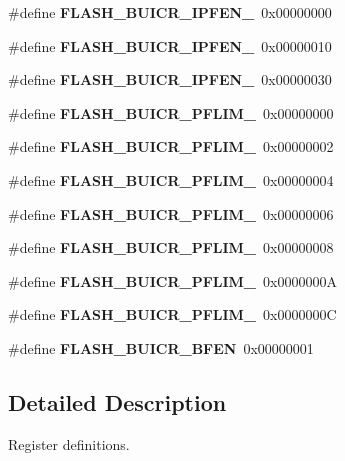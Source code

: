\begin{DoxyCompactItemize}
\item 
\mbox{\label{reg-defs_8h_aa7f5a7d411a1228d39bd9f248274e2bf}} 
\#define {\bfseries F\+L\+A\+S\+H\+\_\+\+B\+U\+I\+C\+R\+\_\+\+I\+P\+F\+E\+N\+\_}~0x00000000
\item 
\mbox{\label{reg-defs_8h_ab41bc9fd6944ae9451d095aac8290ccf}} 
\#define {\bfseries F\+L\+A\+S\+H\+\_\+\+B\+U\+I\+C\+R\+\_\+\+I\+P\+F\+E\+N\+\_}~0x00000010
\item 
\mbox{\label{reg-defs_8h_aeefc9d3ed5856912bfe6ab5da76278e8}} 
\#define {\bfseries F\+L\+A\+S\+H\+\_\+\+B\+U\+I\+C\+R\+\_\+\+I\+P\+F\+E\+N\+\_}~0x00000030
\item 
\mbox{\label{reg-defs_8h_ab03845501d962e827b3a86c6a37a3ec2}} 
\#define {\bfseries F\+L\+A\+S\+H\+\_\+\+B\+U\+I\+C\+R\+\_\+\+P\+F\+L\+I\+M\+\_}~0x00000000
\item 
\mbox{\label{reg-defs_8h_ac730dd960039d3eeffe9a1a26efdcfab}} 
\#define {\bfseries F\+L\+A\+S\+H\+\_\+\+B\+U\+I\+C\+R\+\_\+\+P\+F\+L\+I\+M\+\_}~0x00000002
\item 
\mbox{\label{reg-defs_8h_a8a24ce58132aa66f821b9fc68f351e91}} 
\#define {\bfseries F\+L\+A\+S\+H\+\_\+\+B\+U\+I\+C\+R\+\_\+\+P\+F\+L\+I\+M\+\_}~0x00000004
\item 
\mbox{\label{reg-defs_8h_af2fc91e06d03359f259cded35ed5b239}} 
\#define {\bfseries F\+L\+A\+S\+H\+\_\+\+B\+U\+I\+C\+R\+\_\+\+P\+F\+L\+I\+M\+\_}~0x00000006
\item 
\mbox{\label{reg-defs_8h_a9b68ba27e80dca1237f361ea7b66ae93}} 
\#define {\bfseries F\+L\+A\+S\+H\+\_\+\+B\+U\+I\+C\+R\+\_\+\+P\+F\+L\+I\+M\+\_}~0x00000008
\item 
\mbox{\label{reg-defs_8h_a42ce5eac94aabb79a14d8697417ac7c4}} 
\#define {\bfseries F\+L\+A\+S\+H\+\_\+\+B\+U\+I\+C\+R\+\_\+\+P\+F\+L\+I\+M\+\_}~0x0000000A
\item 
\mbox{\label{reg-defs_8h_adb78fb9a4ad177aace2b5b10ea41d6af}} 
\#define {\bfseries F\+L\+A\+S\+H\+\_\+\+B\+U\+I\+C\+R\+\_\+\+P\+F\+L\+I\+M\+\_}~0x0000000C
\item 
\mbox{\label{reg-defs_8h_a4e28481010c8bc3b144532f687294db1}} 
\#define {\bfseries F\+L\+A\+S\+H\+\_\+\+B\+U\+I\+C\+R\+\_\+\+B\+F\+EN}~0x00000001
\end{DoxyCompactItemize}


\subsection{Detailed Description}
Register definitions. 

